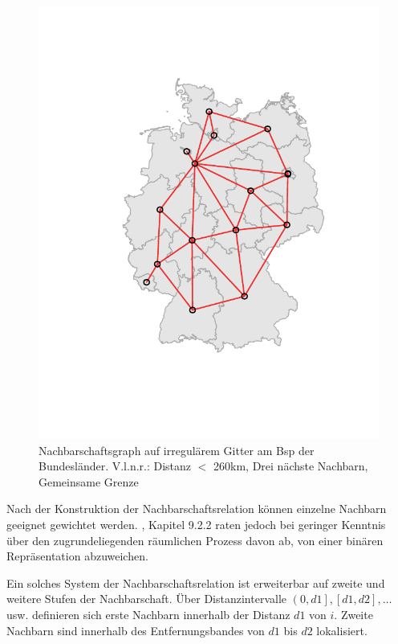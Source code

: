 \begin{figure}
\begin{minipage}[b]{.3\linewidth}
       \includegraphics[width=\linewidth,trim={2cm 3cm 1.7cm 2cm},clip]{body/figures/53-BL_nb_qc.pdf}
    \end{minipage}
    \caption[Nachbarschaftsgraph]{Nachbarschaftsgraph auf irregulärem Gitter am Bsp der Bundesländer. 
    V.l.n.r.: Distanz $<$ 260km, Drei nächste Nachbarn, Gemeinsame Grenze}
    \label{fig_neighbourgraphs}
 \end{figure}

Nach der Konstruktion der Nachbarschaftsrelation können einzelne Nachbarn geeignet gewichtet werden. 
\cite{bivand_applied_2013}, Kapitel 9.2.2 raten jedoch bei geringer Kenntnis über den zugrundeliegenden 
räumlichen Prozess davon ab, von einer binären Repräsentation abzuweichen.


Ein solches System der Nachbarschaftsrelation ist erweiterbar auf zweite und weitere Stufen der Nachbarschaft. 
Über Distanzintervalle $\left(0,d1\right],\left[d1,d2\right],\ldots$ usw. definieren sich erste Nachbarn innerhalb 
der Distanz $d1$ von $i$. Zweite Nachbarn sind innerhalb des Entfernungsbandes von $d1$ bis $d2$ lokalisiert.


